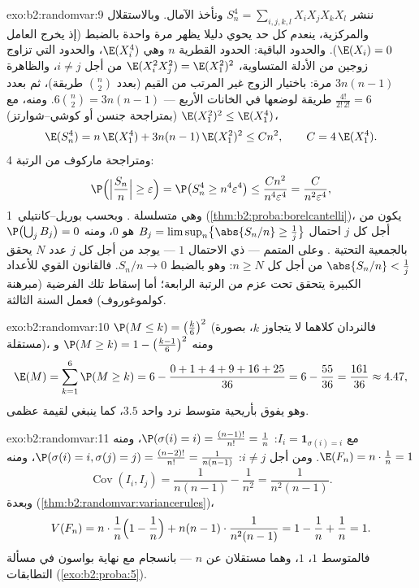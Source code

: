 \begin{solution}{exo:b2:randomvar:9}
ننشر $S_n^4 = \sum_{i,j,k,l}X_iX_jX_kX_l$ ونأخذ الآمال. وبالاستقلال والمركزية، ينعدم كل حد يحوي
دليلا يظهر مرة واحدة بالضبط (إذ يخرج العامل $\E(X_i) = 0$). والحدود
الباقية: الحدود القطرية $n$ وهي $\E(X_i^4)$، والحدود التي تزاوج زوجين
من الأدلة المتساوية، $\E(X_i^2X_j^2) =
\E(X_1^2)^2$ من أجل $i \neq j$، والظاهرة $3n(n-1)$ مرة:
باختيار الزوج غير المرتب من القيم (بعدد $\binom n2$ طريقة)، ثم بعدد
$\frac{4!}{2!\,2!} = 6$ طريقة لوضعها في الخانات الأربع --- $6\binom n2 = 3n(n-1)$. ومنه، مع $\E(X_1^2)^2
\leq \E(X_1^4)$
(بمتراجحة جنسن أو كوشي--شوارتز)،
\[
\E(S_n^4) = n\,\E(X_1^4) + 3n(n-1)\,\E(X_1^2)^2
\leq C n^2,
\qquad C = 4\,\E(X_1^4) .
\]
ومتراجحة ماركوف من الرتبة 4:
\[
\P\Bigl(\Bigl|\frac{S_n}{n}\Bigr| \geq \varepsilon\Bigr)
= \P\bigl(S_n^4 \geq n^4\varepsilon^4\bigr)
\leq \frac{Cn^2}{n^4\varepsilon^4}
= \frac{C}{n^2\varepsilon^4} ,
\]
وهي متسلسلة . وبحسب بوريل--كانتيلي~1 (\cref{thm:b2:proba:borelcantelli})، يكون من
أجل كل $j$ احتمال  $B_j = \limsup_n\bigl\{\abs{S_n/n} \geq \frac1j\bigr\}$ هو $0$، ومنه $\P\bigl(\bigcup_j B_j\bigr) = 0$ بالجمعية
التحتية . وعلى المتمم --- ذي الاحتمال $1$ --- يوجد
من أجل كل $j$ عدد $N$ يحقق $\abs{S_n/n} < \frac1j$ من أجل كل $n \geq N$: وهو
بالضبط $S_n/n \to 0$. فالقانون القوي للأعداد الكبيرة يتحقق تحت عزم من
الرتبة الرابعة؛ أما إسقاط تلك الفرضية (مبرهنة كولموغوروف) فعمل
السنة الثالثة.
\end{solution}

\begin{solution}{exo:b2:randomvar:10}
$\P(M \leq k) = \bigl(\frac k6\bigr)^2$ (فالنردان كلاهما لا يتجاوز $k$، بصورة مستقلة)، ومنه
$\P(M \geq k) = 1 -
\bigl(\frac{k-1}6\bigr)^2$ و
\[
\E(M) = \sum_{k=1}^6\P(M \geq k)
= 6 - \frac{0 + 1 + 4 + 9 + 16 + 25}{36}
= 6 - \frac{55}{36} = \frac{161}{36} \approx 4.47 ,
\]
وهو يفوق بأريحية متوسط نرد واحد $3.5$، كما ينبغي لقيمة عظمى.
\end{solution}

\begin{solution}{exo:b2:randomvar:11}
مع $I_i = \mathbf 1_{\sigma(i) = i}$: $\P(\sigma(i) = i) =
\frac{(n-1)!}{n!} = \frac1n$، ومنه $\E(F_n) = n\cdot\frac1n =
1$. ومن أجل $i \neq j$: $\P(\sigma(i) = i, \sigma(j) = j) =
\frac{(n-2)!}{n!} = \frac1{n(n-1)}$، ومنه
\[
\operatorname{Cov}(I_i, I_j) = \frac1{n(n-1)} - \frac1{n^2}
= \frac{1}{n^2(n-1)} .
\]
وبعدة  (\cref{thm:b2:randomvar:variancerules})،
\[
V(F_n) = n\cdot\frac1n\Bigl(1 - \frac1n\Bigr)
+ n(n-1)\cdot\frac1{n^2(n-1)}
= 1 - \frac1n + \frac1n = 1 .
\]
فالمتوسط $1$،  $1$، وهما مستقلان عن $n$ ---
بانسجام مع نهاية بواسون في مسألة التطابقات (\cref{exo:b2:proba:5}).
\end{solution}

